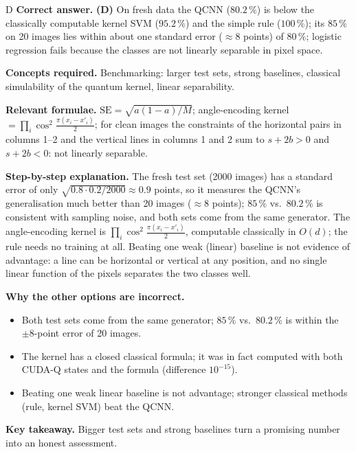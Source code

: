 \documentclass[11pt,a4paper]{article}
\newcommand{\qsep}{\par\vspace{2pt}{\color{black!15}\hrule}\vspace{4pt}}
\begin{document}
\begin{solbox}{D}
\textbf{\color{brand}Correct answer.} \textcolor{okgreen}{\textbf{(D)}} On fresh data the QCNN ($80.2\,\%$) is below the classically computable kernel SVM ($95.2\,\%$) and the simple rule ($100\,\%$); its $85\,\%$ on 20 images lies within about one standard error ($\approx8$ points) of $80\,\%$; logistic regression fails because the classes are not linearly separable in pixel space.

\textbf{\color{brand}Concepts required.} Benchmarking: larger test sets, strong baselines, classical simulability of the quantum kernel, linear separability.

\textbf{\color{brand}Relevant formulae.} $\mathrm{SE} = \sqrt{a(1 - a)/M}$; angle-encoding kernel $= \prod_i\cos^2\frac{\pi(x_i - x'_i)}{2}$; for clean images the constraints of the horizontal pairs in columns 1--2 and the vertical lines in columns 1 and 2 sum to $s + 2b > 0$ and $s + 2b < 0$: not linearly separable.

\textbf{\color{brand}Step-by-step explanation.} The fresh test set (2000 images) has a standard error of only $\sqrt{0.8\cdot0.2/2000} \approx 0.9$ points, so it measures the QCNN's
generalisation much better than 20 images ($\approx8$ points); $85\,\%$ vs.\ $80.2\,\%$ is consistent with sampling noise, and both sets come
from the same generator. The angle-encoding kernel is $\prod_i\cos^2\frac{\pi(x_i - x'_i)}{2}$, computable classically in $O(d)$; the rule needs
no training at all. Beating one weak (linear) baseline is not evidence of advantage: a line can be horizontal or vertical at any position,
and no single linear function of the pixels separates the two classes well.

\textbf{\color{brand}Why the other options are incorrect.}
\begin{itemize}[leftmargin=2.4em, itemsep=1pt, topsep=2pt]
\item[\textbf{(A)}] Both test sets come from the same generator; $85\,\%$ vs.\ $80.2\,\%$ is within the $\pm8$-point error of 20 images.
\item[\textbf{(B)}] The kernel has a closed classical formula; it was in fact computed with both CUDA-Q states and the formula (difference $10^{-15}$).
\item[\textbf{(C)}] Beating one weak linear baseline is not advantage; stronger classical methods (rule, kernel SVM) beat the QCNN.
\end{itemize}
\textbf{\color{brand}Key takeaway.} Bigger test sets and strong baselines turn a promising number into an honest assessment.
\end{solbox}
\qsep
\end{document}
